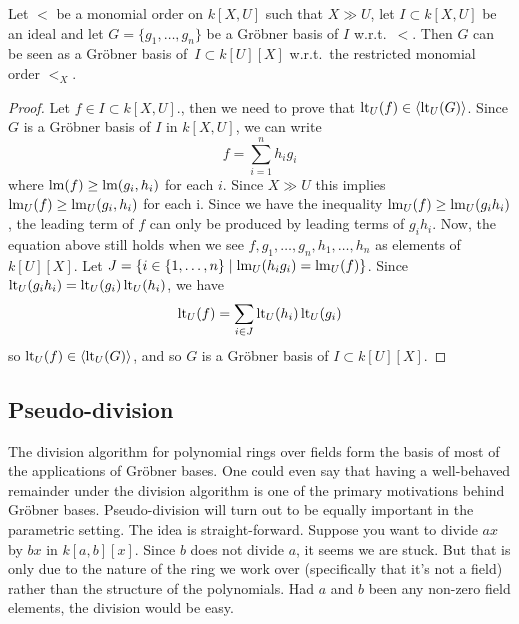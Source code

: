 \begin{lemma}\label{lem:block_order}
  Let $<$ be a monomial order on $k[X, U]$ such that $X \gg U$, let $I \subset k[X, U]$ be an ideal and let $G = \{g_{1}, \dots, g_{n}\}$ be a Gröbner basis of $I$ w.r.t.\ $<$. Then $G$ can be seen as a Gröbner basis of $\,I \subset k[U][X]$ w.r.t.\ the restricted monomial order $<_{X}$.
\end{lemma}
\begin{proof}
  Let $f \in I \subset k[X, U]$., then we need to prove that $\operatorname{lt}_{U}(f) \in \langle \operatorname{lt}_{U}(G) \rangle$. Since $G$ is a Gröbner basis of $I$ in $k[X, U]$, we can write
  \[ f = \sum_{i=1}^{n} h_{i} g_{i} \]
  where $\operatorname{lm}(f) \geq \operatorname{lm}(g_{i}, h_{i})$ for each $i$. Since $X \gg U$ this implies $\operatorname{lm}_{U}(f) \geq \operatorname{lm}_{U}(g_{i}, h_{i})$ for each i. Since we have the inequality $\operatorname{lm}_{U}(f) \geq \operatorname{lm}_{U}(g_{i} h_{i})$, the leading term of $f$ can only be produced by leading terms of $g_{i}h_{i}$. Now, the equation above still holds when we see $f, g_{1}, \dots, g_{n}, h_{1}, \dots, h_{n}$ as elements of $k[U][X]$. Let $J = \{i \in \{1, \dots, n\} \mid \operatorname{lm}_{U}(h_{i} g_{i}) = \operatorname{lm}_{U}(f)\}$. Since $\operatorname{lt}_{U}(g_{i} h_{i}) = \operatorname{lt}_{U}(g_{i})\operatorname{lt}_{U}(h_{i})$, we have
  \[\operatorname{lt}_{U}(f) = \sum_{i \in J} \operatorname{lt}_{U}(h_{i}) \operatorname{lt}_{U}(g_{i})\]
  so $\operatorname{lt}_{U}(f) \in \langle \operatorname{lt}_{U}(G) \rangle$, and so $G$ is a Gröbner basis of $I \subset k[U][X]$.
\end{proof}











\subsection{Pseudo-division}\label{sec:ps_div}
The division algorithm for polynomial rings over fields form the basis of most of the applications of Gröbner bases. One could even say that having a well-behaved remainder under the division algorithm is one of the primary motivations behind Gröbner bases. Pseudo-division will turn out to be equally important in the parametric setting. The idea is straight-forward. Suppose you want to divide $ax$ by $bx$ in $k[a, b][x]$. Since $b$ does not divide $a$, it seems we are stuck. But that is only due to the nature of the ring we work over (specifically that it's not a field) rather than the structure of the polynomials. Had $a$ and $b$ been any non-zero field elements, the division would be easy.

